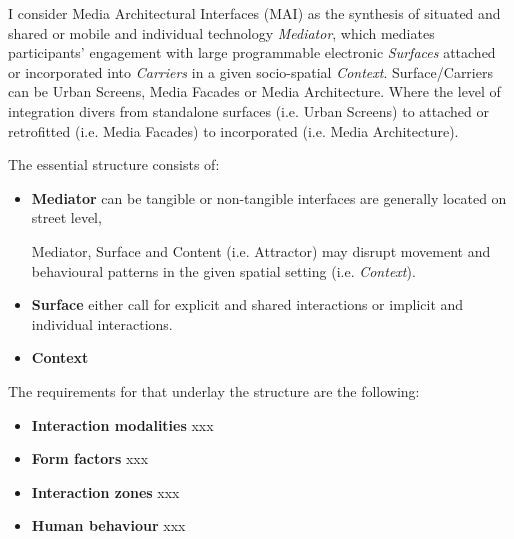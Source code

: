 
I consider Media Architectural Interfaces (MAI) as the synthesis of situated and shared or mobile and individual technology \textit{Mediator}, which mediates participants’ engagement with large programmable electronic \textit{Surfaces} attached or incorporated into \textit{Carriers} in a given socio-spatial \textit{Context}.
Surface/Carriers can be Urban Screens, Media Facades or Media Architecture.
Where the level of integration divers from standalone surfaces (i.e. Urban Screens) to attached or retrofitted (i.e. Media Facades) to incorporated (i.e. Media Architecture).

The essential structure consists of:
\begin{itemize}
\item \textbf{Mediator}  can be tangible or non-tangible interfaces are generally located on street level, 

Mediator, Surface and Content (i.e. Attractor) may disrupt movement and behavioural patterns in the given spatial setting (i.e. \textit{Context}).

\item \textbf{Surface} either call for explicit and shared interactions or implicit and individual interactions.

\item \textbf{Context} 

\end{itemize}

The requirements for that underlay the structure are the following:

\begin{itemize}
\item \textbf{Interaction modalities}  xxx

\item \textbf{Form factors} xxx

\item \textbf{Interaction zones} xxx 

\item \textbf{Human behaviour} xxx

\end{itemize}



